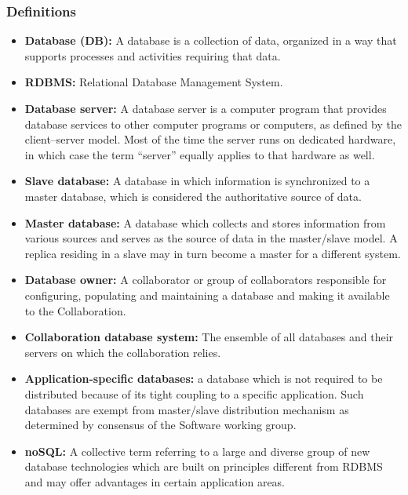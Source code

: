 \subsubsection{Definitions}
\begin{itemize}

\item \textbf{Database (DB):} A database is a collection of data, organized in a way that supports processes and activities requiring that data.

\item \textbf{RDBMS:} Relational Database Management System.

\item \textbf{Database server:} A database server is a computer program that provides database services to other computer
programs or computers, as defined by the client–server model. Most of the time the server runs on dedicated hardware,
in which case the term ``server'' equally applies to that hardware as well.

\item \textbf{Slave database:} A database in which information is synchronized to a master database,
which is considered the authoritative source of data.

\item \textbf{Master database:} A database which collects and stores information from various sources
and serves as the source of data in the master/slave model. A replica residing in a slave may in turn
become a master for a different system.

\item \textbf{Database owner:} A collaborator or group of collaborators responsible for configuring,
populating and maintaining a database and making it available to the Collaboration.

\item \textbf{Collaboration database system:} The ensemble of all databases and their servers on which the collaboration relies.

\item \textbf{Application-specific databases:} a database which is not required to be distributed because of its tight
coupling to a specific application. Such databases are exempt from master/slave distribution mechanism as determined
by consensus of the Software working group.

\item \textbf{noSQL:} A collective term referring to a large and diverse group of new database technologies which
are built on principles different from RDBMS and may offer advantages in certain application areas.
\end{itemize}

